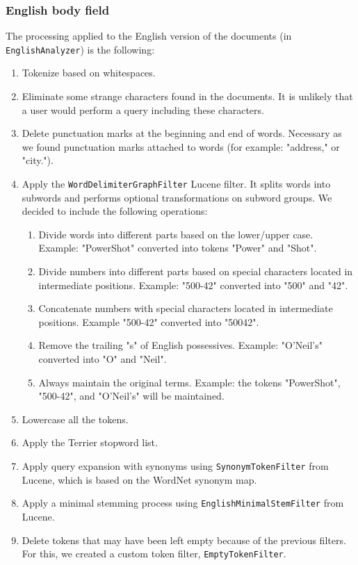 \subsubsection{English body field}
The processing applied to the English version of the documents (in \texttt{EnglishAnalyzer}) is the following:
\begin{enumerate}
    \item Tokenize based on whitespaces.
    \item Eliminate some strange characters found in the documents.
    It is unlikely that a user would perform a query including these characters.
    \item Delete punctuation marks at the beginning and end of words.
    Necessary as we found punctuation marks attached to words (for example: "address," or "city.").
    \item Apply the \texttt{WordDelimiterGraphFilter} Lucene filter.
    It splits words into subwords and performs optional transformations on subword groups.
    We decided to include the following operations:
    \begin{enumerate}
        \item Divide words into different parts based on the lower/upper case.
        Example: "PowerShot" converted into tokens "Power" and "Shot".
        \item Divide numbers into different parts based on special characters located in intermediate positions.
        Example: "500-42" converted into "500" and "42".
        \item Concatenate numbers with special characters located in intermediate positions.
        Example "500-42" converted into "50042".
        \item Remove the trailing "s" of English possessives.
        Example: "O'Neil's" converted into "O" and "Neil".
        \item Always maintain the original terms.
        Example: the tokens "PowerShot", "500-42", and "O'Neil's" will be maintained.
    \end{enumerate}
    \item Lowercase all the tokens.
    \item Apply the Terrier\cite{OunisEtAl2006} stopword list.
    \item Apply query expansion with synonyms using \texttt{SynonymTokenFilter} from Lucene, which is based on the
    WordNet synonym map\cite{wordnet}.
    \item Apply a minimal stemming process using \texttt{EnglishMinimalStemFilter} from Lucene.
    \item Delete tokens that may have been left empty because of the previous filters.
    For this, we created a custom token filter, \texttt{EmptyTokenFilter}.
\end{enumerate}

